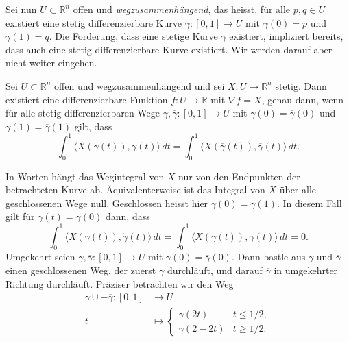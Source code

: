 \documentclass[../main.tex]{subfiles}
\begin{document}
Sei nun $U \subset \mathbb{R}^n$ offen und
\emph{wegzusammenhängend}, das heisst, für
alle $p , q \in U$ existiert eine stetig
differenzierbare
Kurve $\gamma \colon [0, 1] \to U$ mit $\gamma(0) = p$
und $\gamma(1) = q$.
Die Forderung, dass eine stetige Kurve $\gamma$
existiert, impliziert bereits, dass auch eine stetig
differenzierbare Kurve existiert. Wir werden darauf
aber nicht weiter eingehen.

\begin{proposition}\label{prop:gradient-fields-curves}
  Sei $U \subset \mathbb{R}^n$ offen
  und wegzusammenhängend und
  sei $X \colon U \to \mathbb{R}^n$ stetig.
  Dann existiert eine differenzierbare Funktion
  $f \colon U \to \mathbb{R}$ mit $\nabla f = X$,
  genau dann, wenn für alle stetig differenzierbaren
  Wege $\gamma, \overline \gamma \colon [0, 1] \to U$
  mit $\gamma(0) = \overline \gamma ( 0) $ und
  $\gamma(1) = \overline\gamma(1)$ gilt, dass
  \[
    \int_{0}^{1} \langle X(\gamma(t)), \dot \gamma(t) \rangle \, dt
    =
    \int_{0}^{1} \langle X(\overline\gamma(t)),
    \dot{\overline\gamma}(t) \rangle \, dt.
  \]
\end{proposition}

In Worten hängt das Wegintegral von $X$ nur von den Endpunkten
der betrachteten Kurve ab. Äquivalenterweise ist das Integral
von $X$ über alle geschlossenen Wege null.
Geschlossen heisst hier $\gamma(0) = \gamma(1)$.
In diesem Fall gilt für $\overline \gamma(t) = \gamma(0)$
dann, dass
\[
  \int_{0}^{1} \langle X(\gamma(t)), \dot \gamma(t) \rangle \, dt
  =
  \int_{0}^{1} \langle X(\overline\gamma(t)),
  \dot{\overline\gamma}(t) \rangle \, dt = 0.
\]
Umgekehrt seien $\gamma, \overline \gamma \colon [0, 1] \to U$
mit $\gamma(0) = \overline \gamma(0)$.
Dann bastle aus $\gamma$ und $\overline \gamma$
einen geschlossenen Weg, der zuerst
$\gamma$ durchläuft, und darauf $\overline \gamma$ in umgekehrter
Richtung durchläuft.
Präziser betrachten wir den Weg
\begin{align*}
  \gamma \cup - \overline \gamma \colon [0, 1] & \to U \\
  t & \mapsto
  \begin{cases}
    \gamma(2t) & t \leq 1/2,\\
    \overline \gamma (2 - 2t) & t \geq 1/2.
  \end{cases}
\end{align*}
\end{document}
